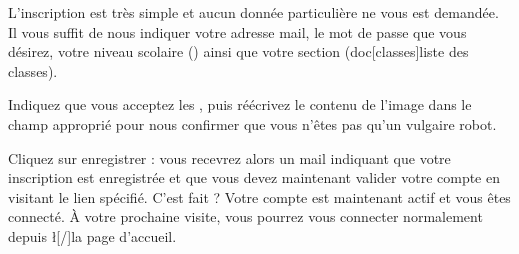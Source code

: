 ﻿L’inscription est très simple et aucun donnée particulière ne vous est demandée. Il vous suffit de nous indiquer votre adresse mail, le mot de passe que vous désirez, votre niveau scolaire () ainsi que votre section (doc[classes]{liste des classes}).

Indiquez que vous acceptez les , puis réécrivez le contenu de l’image dans le champ approprié pour nous confirmer que vous n’êtes pas qu’un vulgaire robot.

Cliquez sur enregistrer : vous recevrez alors un mail indiquant que votre inscription est enregistrée et que vous devez maintenant valider votre compte en visitant le lien spécifié.
C’est fait ? Votre compte est maintenant actif et vous êtes connecté. À votre prochaine visite, vous pourrez vous connecter normalement depuis \l[/]{la page d’accueil}.
